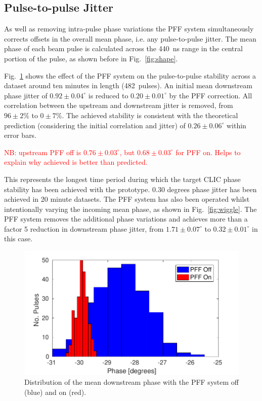 \documentclass[%
 reprint,
 amsmath,amssymb,
 prl,
]{revtex4-1}
\begin{document}
\subsection{\label{ss:meanJit}Pulse-to-pulse Jitter}

As well as removing intra-pulse phase variations the PFF system simultaneously 
corrects offsets in the overall mean phase, i.e. any pulse-to-pulse jitter. The 
mean phase of each beam pulse is calculated across the 440~ns range in the 
central portion of the pulse, as shown before in Fig.~\ref{fig:shape}.

Fig.~\ref{fig:meanJit} shows the effect of the PFF system on the pulse-to-pulse 
stability across a dataset around ten minutes in length (482~pulses). An 
initial mean downstream phase jitter of \(0.92\pm0.04^\circ\) is reduced to \(0.20\pm0.01^\circ\) by the PFF 
correction. All correlation between the upstream and downstream jitter is removed, from 
\(96\pm2\%\) to \(0\pm7\%\). The achieved stability is consistent with the theoretical prediction (considering the initial correlation and jitter) of \(0.26\pm0.06^\circ\) within error bars.

\textcolor{red}{NB: upstream PFF off is \(0.76\pm0.03^\circ\), but \(0.68\pm0.03^\circ\) for 
PFF on. Helps to explain why achieved is better than predicted.}

This represents the longest time period during which the target CLIC phase 
stability has been achieved with the prototype. 0.30 degrees phase jitter has 
been achieved in 20 minute datasets. The PFF system has also been operated 
whilst intentionally varying the incoming mean phase, as shown in 
Fig.~\ref{fig:wiggle}. The PFF system removes the additional phase variations 
and achieves more than a factor 5 reduction in downstream phase jitter, from 
\(1.71\pm0.07^\circ\) to \(0.32\pm0.01^\circ\) in this case.

\begin{figure}
\includegraphics[width=\columnwidth]{figs/meanJit}%
\caption{\label{fig:meanJit}Distribution of the mean downstream phase with the 
PFF system off (blue) and on (red).}
\end{figure}
\end{document}

